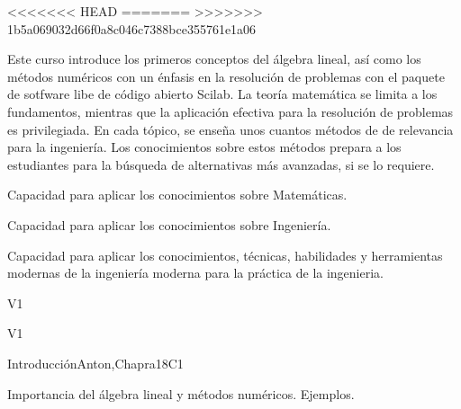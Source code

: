 \begin{syllabus}

<<<<<<< HEAD
=======
>>>>>>> 1b5a069032d66f0a8c046c7388bce355761e1a06

\begin{justification}
Este curso introduce los primeros conceptos del álgebra lineal, así como los métodos numéricos con un énfasis en la resolución de problemas
con el paquete de sotfware libe de código abierto Scilab.
La teoría matemática se limita a los fundamentos, mientras que la aplicación efectiva para la resolución de problemas es privilegiada. 
En cada tópico, se enseña unos cuantos métodos de de relevancia para la ingeniería. 
Los conocimientos sobre estos métodos prepara a los estudiantes para la búsqueda de alternativas más avanzadas, si se lo requiere.
\end{justification}

\begin{goals}
\item Capacidad para aplicar los conocimientos sobre Matemáticas.
\item Capacidad para aplicar los conocimientos sobre Ingeniería.
\item Capacidad para aplicar los conocimientos, técnicas, habilidades y herramientas modernas de la ingeniería moderna para la práctica de la ingenieria.
\end{goals}

\begin{outcomes}{V1}
    \item {}
    \item {}
\end{outcomes}

\begin{competences}{V1}
    \item {} 
    \item {} 
    \item {} 
\end{competences}

\begin{unit}{Introducción}{}{Anton,Chapra}{18}{C1}
  \begin{topics}
      \item Importancia del álgebra lineal y métodos numéricos. Ejemplos.
   \end{topics}


\end{unit}
\end{syllabus}
